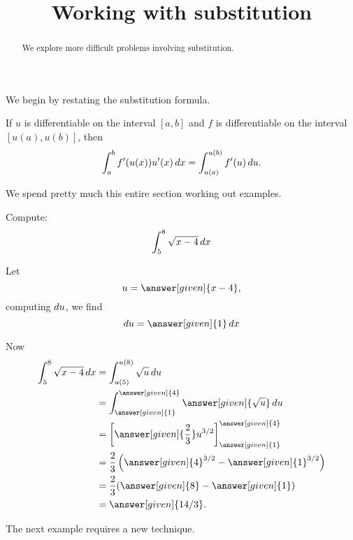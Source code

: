\documentclass{ximera}
\title[Dig-In:]{Working with substitution}
\begin{document}
\begin{abstract}
We explore more difficult problems involving substitution.
\end{abstract}
\maketitle


We begin by restating the substitution formula.


\begin{theorem} 
If $u$ is differentiable on the interval $[a,b]$ and $f$ is
differentiable on the interval $[u(a),u(b)]$, then
\[
\int_a^b f'(u(x)) u'(x) \mathop{}\!d x =\int_{u(a)}^{u(b)} f'(u) \mathop{}\!d u.
\]
\end{theorem}

We spend pretty much this entire section working out examples.


\begin{example}
Compute:
\[
\int_{5}^{8}\sqrt{x-4} \mathop{}\!d x
\]
\begin{explanation}
  Let
  \[
  u =\answer[given]{x-4},
  \]
  computing $\mathop{}\!d u$, we find
  \[
  \d u =\answer[given]{1}\d x
  \]
  
  Now
\begin{align*}
\int_{5}^{8}\sqrt{x-4} \d x &= \int_{u(5)}^{u(8)} \sqrt{u}\d u  \\
&= \int_{\answer[given]{1}}^{\answer[given]{4}} \answer[given]{\sqrt{u}} \d u\\
&= \eval{\answer[given]{\frac{2}{3}}u^{3/2}}_{\answer[given]{1}}^{\answer[given]{4}}\\
&= \frac{2}{3}\left(\answer[given]{4}^{3/2}-\answer[given]{1}^{3/2}\right)\\
&= \frac{2}{3}(\answer[given]{8}-\answer[given]{1})\\
&= \answer[given]{14/3}.
\end{align*}
\end{explanation}
\end{example}


The next example requires a new technique.
\end{document}
